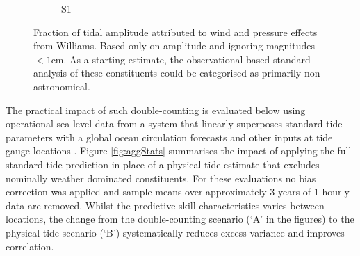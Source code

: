 \begin{figure}[h]
\begin{subfigure}[b]{\figwidthHalf}
        \caption{S1}
    \end{subfigure}
    \caption{Fraction of tidal amplitude attributed to wind and pressure effects from Williams\citep{10.5194/os-2020-107}.  Based only on amplitude and ignoring magnitudes $<1$cm.  As a starting estimate, the observational-based standard analysis of these constituents could be categorised as primarily non-astronomical.}
    \label{fig:williamsFraction}
\end{figure}

The practical impact of such double-counting is evaluated below using operational sea level data from a system that linearly superposes standard tide parameters with a global ocean circulation forecasts and other inputs at tide gauge locations \citep{Taylor:2017coa}\citep{10.1080/1755876x.2019.1685834}.
Figure \ref{fig:aggStats} summarises the impact of applying the full standard tide prediction 
in place of a physical tide estimate that excludes nominally weather dominated constituents.
For these evaluations no bias correction was applied and sample means over approximately 3 years of 1-hourly data are removed.  Whilst the predictive skill characteristics varies between locations, the change from the double-counting scenario (`A' in the figures) to the physical tide scenario (`B') systematically reduces excess variance and improves correlation.


